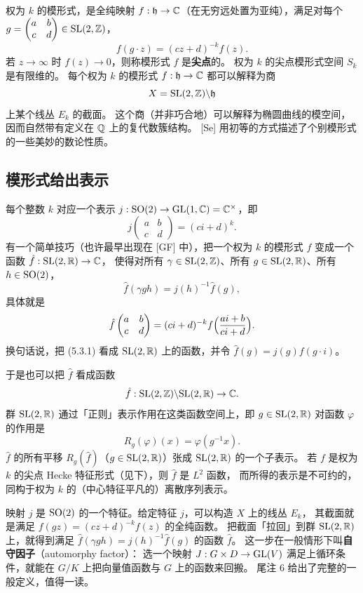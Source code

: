 权为 $k$ 的模形式，是全纯映射 $f:\mathfrak{h}\to\mathbb{C}$（在无穷远处置为亚纯），满足对每个
$g=\begin{pmatrix}a&b\\ c&d\end{pmatrix}\in\mathrm{SL}(2,\mathbb{Z})$，
\[
f(g\cdot z)=(cz+d)^{-k}f(z).
\]
若 $z\to\infty$ 时 $f(z)\to 0$，则称模形式 $f$ 是\textbf{尖点}的。
权为 $k$ 的尖点模形式空间 $S_k$ 是有限维的。
每个权为 $k$ 的模形式 $f:\mathfrak{h}\to\mathbb{C}$ 都可以解释为商
\[
X=\mathrm{SL}(2,\mathbb{Z})\backslash\mathfrak{h}
\]
上某个线丛 $E_k$ 的截面。
这个商（并非巧合地）可以解释为椭圆曲线的模空间，因而自然带有定义在 $\mathbb{Q}$ 上的复代数簇结构。
[Se] 用初等的方式描述了个别模形式的一些美妙的数论性质。

\subsection{模形式给出表示}

每个整数 $k$ 对应一个表示 $j:\mathrm{SO}(2)\to\mathrm{GL}(1,\mathbb{C})=\mathbb{C}^{\times}$，即
\begin{equation*}
j\begin{pmatrix}a&b\\ c&d\end{pmatrix}=(ci+d)^k .
\tag{5.3.1}
\end{equation*}
有一个简单技巧（也许最早出现在 [GF] 中），把一个权为 $k$ 的模形式 $f$ 变成一个函数 $\hat f:\mathrm{SL}(2,\mathbb{R})\to\mathbb{C}$，
使得对所有 $\gamma\in\mathrm{SL}(2,\mathbb{Z})$、所有 $g\in\mathrm{SL}(2,\mathbb{R})$、所有 $h\in\mathrm{SO}(2)$，
\[
\hat f(\gamma gh)=j(h)^{-1}\hat f(g),
\]
具体就是
\[
\hat f\begin{pmatrix}a&b\\ c&d\end{pmatrix}
=(ci+d)^{-k}f\Bigl(\frac{ai+b}{ci+d}\Bigr).
\]
换句话说，把 (5.3.1) 看成 $\mathrm{SL}(2,\mathbb{R})$ 上的函数，并令 $\hat f(g)=j(g)f(g\cdot i)$。

于是也可以把 $\hat f$ 看成函数
\[
\hat f:\mathrm{SL}(2,\mathbb{Z})\backslash\mathrm{SL}(2,\mathbb{R})\to\mathbb{C} .
\]
群 $\mathrm{SL}(2,\mathbb{R})$ 通过「正则」表示作用在这类函数空间上，即 $g\in\mathrm{SL}(2,\mathbb{R})$ 对函数 $\varphi$ 的作用是
\[
R_g(\varphi)(x)=\varphi(g^{-1}x).
\]
$\hat f$ 的所有平移 $R_g(\hat f)$（$g\in\mathrm{SL}(2,\mathbb{R})$）张成 $\mathrm{SL}(2,\mathbb{R})$ 的一个子表示。
若 $f$ 是权为 $k$ 的尖点 Hecke 特征形式（见下），则 $\hat f$ 是 $L^2$ 函数，
而所得的表示是不可约的，同构于权为 $k$ 的（中心特征平凡的）离散序列表示。

\begin{yizhu}
映射 $j$ 是 $\mathrm{SO}(2)$ 的一个特征。给定特征 $j$，可以构造 $X$ 上的线丛 $E_k$，
其截面就是满足 $f(gz)=(cz+d)^{-k}f(z)$ 的全纯函数。
把截面「拉回」到群 $\mathrm{SL}(2,\mathbb{R})$ 上，就得到满足 $\hat f(\gamma gh)=j(h)^{-1}\hat f(g)$ 的函数 $\hat f$。
这一步在一般情形下叫\textbf{自守因子}（automorphy factor）：
选一个映射 $J:G\times D\to\mathrm{GL}(V)$ 满足上循环条件，就能在 $G/K$ 上把向量值函数与 $G$ 上的函数来回搬。
尾注 6 给出了完整的一般定义，值得一读。
\end{yizhu}

